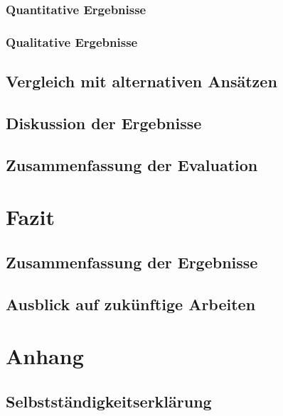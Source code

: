 \documentclass[a4paper,10pt,twoside]{report}
\begin{document}
\subsection{Quantitative Ergebnisse}
\subsection{Qualitative Ergebnisse}

\section{Vergleich mit alternativen Ansätzen}

\section{Diskussion der Ergebnisse}

\section{Zusammenfassung der Evaluation}

\chapter{Fazit}
\section{Zusammenfassung der Ergebnisse}
\section{Ausblick auf zukünftige Arbeiten}

\printbibliography[title={Literaturverzeichnis}]

\appendix
\chapter{Anhang}
\section*{Selbstständigkeitserklärung}
\end{document}
